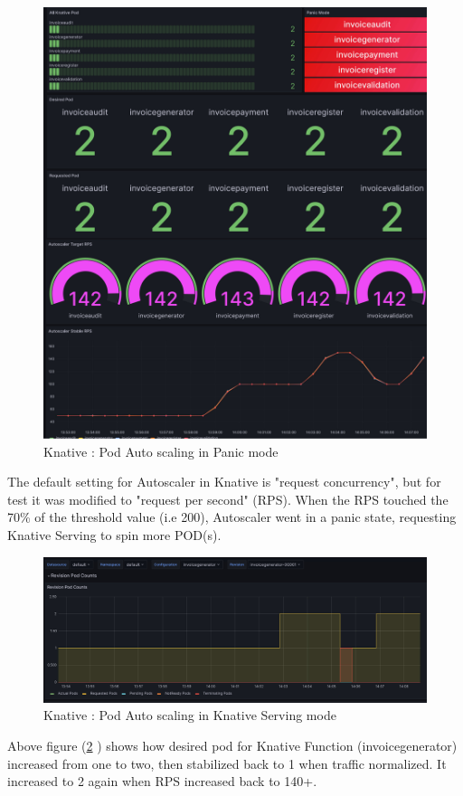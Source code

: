 \documentclass{article}
\begin{document}
\begin{flushleft}
\begin{figure}[h]
    \centering
    \includegraphics[scale=0.5]{images/Grafana/Grafana_Autoscaling_Panic.PNG}
    \caption{Knative : Pod Auto scaling in Panic mode}
    \label{fig:Pod_Autoscaling_panic}
\end{figure}
\hfill\break
The default setting for Autoscaler in Knative is "request concurrency", but for test it was modified to "request per second" (RPS).  When the RPS touched the 70\% of the threshold value (i.e 200), Autoscaler went in a panic state, requesting Knative Serving to spin more POD(s).   
\break
\begin{figure}[h]
    \centering
    \includegraphics[scale=0.5]{images/Grafana/Grafana_Autoscaling_Knative_Serving_SinglePod}
    \caption{Knative : Pod Auto scaling in Knative Serving mode}
    \label{fig:Pod_Autoscaling_KnativeServing}
\end{figure}
\hfill\break
Above figure (\ref{fig:Pod_Autoscaling_KnativeServing} ) shows how desired pod for Knative Function (invoicegenerator) increased from one to two, then stabilized back to 1 when traffic normalized. It increased to 2 again when RPS increased back to 140+.
    
\end{flushleft}
\pagebreak
\end{document}

